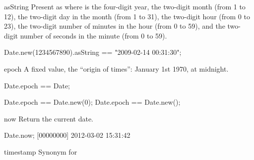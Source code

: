 \begin{urbiscriptapi}
\item[asString]
  Present as  where  is the four-digit
  year,  the two-digit month (from 1 to 12),  the
  two-digit day in the month (from 1 to 31),  the two-digit
  hour (from 0 to 23),  the two-digit number of minutes in the
  hour (from 0 to 59), and  the two-digit number of seconds in
  the minute (from 0 to 59).
\begin{urbiassert}
Date.new(1234567890).asString == "2009-02-14 00:31:30";
\end{urbiassert}

\item[epoch]
  A fixed value, the ``origin of times'': January 1st 1970, at
  midnight.
\begin{urbiassert}
Date.epoch == Date;

Date.epoch == Date.new(0);
Date.epoch == Date.new();
\end{urbiassert}

\item[now]
  Return the current date.
\begin{urbiunchecked}
Date.now;
[00000000] 2012-03-02 15:31:42
\end{urbiunchecked}

\item[timestamp]
Synonym for 

\end{urbiscriptapi}


